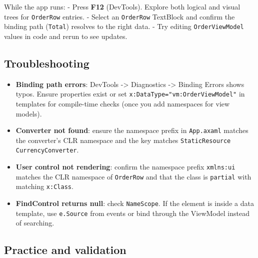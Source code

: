 While the app runs: - Press \textbf{F12} (DevTools). Explore both
logical and visual trees for \passthrough{\lstinline!OrderRow!} entries.
- Select an \passthrough{\lstinline!OrderRow!} TextBlock and confirm the
binding path (\passthrough{\lstinline!Total!}) resolves to the right
data. - Try editing \passthrough{\lstinline!OrderViewModel!} values in
code and rerun to see updates.

\subsection{Troubleshooting}\label{troubleshooting}

\begin{itemize}
\tightlist
\item
  \textbf{Binding path errors}: DevTools -\textgreater{} Diagnostics
  -\textgreater{} Binding Errors shows typos. Ensure properties exist or
  set \passthrough{\lstinline!x:DataType="vm:OrderViewModel"!} in
  templates for compile-time checks (once you add namespaces for view
  models).
\item
  \textbf{Converter not found}: ensure the namespace prefix in
  \passthrough{\lstinline!App.axaml!} matches the converter's CLR
  namespace and the key matches
  \passthrough{\lstinline!StaticResource CurrencyConverter!}.
\item
  \textbf{User control not rendering}: confirm the namespace prefix
  \passthrough{\lstinline!xmlns:ui!} matches the CLR namespace of
  \passthrough{\lstinline!OrderRow!} and that the class is
  \passthrough{\lstinline!partial!} with matching
  \passthrough{\lstinline!x:Class!}.
\item
  \textbf{FindControl returns null}: check
  \passthrough{\lstinline!NameScope!}. If the element is inside a data
  template, use \passthrough{\lstinline!e.Source!} from events or bind
  through the ViewModel instead of searching.
\end{itemize}

\subsection{Practice and validation}\label{practice-and-validation-1}

